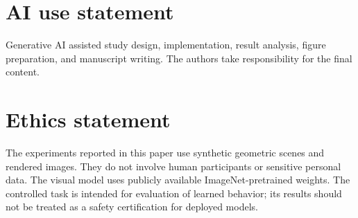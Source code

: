 \hypertarget{ai-use-statement}{%
\section*{AI use statement}\label{ai-use-statement}}

Generative AI assisted study design, implementation, result analysis, figure preparation, and manuscript writing. The authors take responsibility for the final content.

\hypertarget{ethics-statement}{%
\section*{Ethics statement}\label{ethics-statement}}

The experiments reported in this paper use synthetic geometric scenes and rendered images. They do not involve human participants or sensitive personal data. The visual model uses publicly available ImageNet-pretrained weights. The controlled task is intended for evaluation of learned behavior; its results should not be treated as a safety certification for deployed models.
